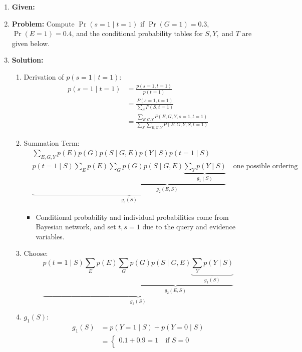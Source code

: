 \begin{example}
    \begin{enumerate}
        \item \textbf{Given:}
        \item \textbf{Problem:} Compute $\Pr(s = 1 \mid t = 1)$ if $\Pr(G = 1) = 0.3$, $\Pr(E = 1) = 0.4$, and the conditional probability tables for $S, Y,$ and $T$ are given below.
        \item \textbf{Solution:}
        \begin{enumerate}
            \item Derivation of $p(s=1 \mid t=1)$: 
            \begin{align*}
                p(s=1 \mid t=1) &= \frac{p(s=1,t=1)}{p(t=1)} \\
                &= \frac{P(s=1,t=1)}{\sum_S P(S,t=1)} \\
                &= \frac{\sum_{E,G,Y} P(E,G,Y,s=1,t=1)}{\sum_S \sum_{E,G,Y} P(E,G,Y,S,t=1)}
            \end{align*}
            \item Summation Term: 
            \begin{align*}
                & \sum_{E,G,Y} p(E) p(G) p(S \mid G,E) p(Y \mid S) p(t=1 \mid S) \\
                & \underbrace{p(t=1 \mid S) \sum_E p(E) \underbrace{\sum_G p(G) p(S \mid G,E) \underbrace{\sum_Y p(Y \mid S)}_{g_1(S)}}_{g_2(E,S)}}_{g_3(S)} \quad \text{one possible ordering}
            \end{align*}
            \begin{itemize}
                \item Conditional probability and individual probabilities come from Bayesian network, and set $t,s=1$ due to the query and evidence variables.
            \end{itemize}
            \item Choose: 
            \[
            \underbrace{p(t=1 \mid S) \sum_E p(E) \underbrace{\sum_G p(G) p(S \mid G,E) \underbrace{\sum_Y p(Y \mid S)}_{g_1(S)}}_{g_2(E,S)}}_{g_3(S)}
            \]
            \item $g_1(S)$: 
            \begin{align*}
                g_1(S) &= p(Y=1 \mid S) + p(Y=0 \mid S) \\
                &= \begin{cases}
                    0.1 + 0.9 = 1 \quad \text{if } S=0 \\

\end{cases}
\end{align*}
\end{enumerate}
\end{enumerate}
\end{example}
